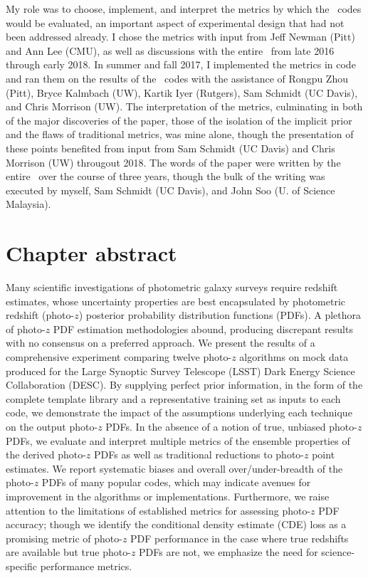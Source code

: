 My role was to choose, implement, and interpret the metrics by which the \pzpdf\ codes would be evaluated, an important aspect of experimental design that had not been addressed already.
I chose the metrics with input from Jeff Newman (Pitt) and Ann Lee (CMU), as well as discussions with the entire \pzwg\ from late 2016 through early 2018.
In summer and fall 2017, I implemented the metrics in code and ran them on the results of the \pzpdf\ codes with the assistance of Rongpu Zhou (Pitt), Bryce Kalmbach (UW), Kartik Iyer (Rutgers), Sam Schmidt (UC Davis), and Chris Morrison (UW).
The interpretation of the metrics, culminating in both of the major discoveries of the paper, those of the isolation of the implicit prior and the flaws of traditional metrics, was mine alone, though the presentation of these points benefited from input from Sam Schmidt (UC Davis) and Chris Morrison (UW) througout 2018.
The words of the paper were written by the entire \pzwg\ over the course of three years, though the bulk of the writing was executed by myself, Sam Schmidt (UC Davis), and John Soo (U. of Science Malaysia).

\section*{Chapter abstract}

Many scientific investigations of photometric galaxy surveys require redshift estimates, whose uncertainty properties are best encapsulated by photometric redshift (photo-$z$) posterior probability distribution functions (PDFs).
A plethora of photo-$z$ PDF estimation methodologies abound, producing discrepant results with no consensus on a preferred approach.
We present the results of a comprehensive experiment comparing twelve photo-$z$ algorithms on mock data produced for the Large Synoptic Survey Telescope (\textsc{LSST}) Dark Energy Science Collaboration (\textsc{DESC}).
By supplying perfect prior information, in the form of the complete template library and a representative training set as inputs to each code, we demonstrate the impact of the assumptions underlying each technique on the output photo-$z$ PDFs.
In the absence of a notion of true, unbiased photo-$z$ PDFs, we evaluate and interpret multiple metrics of the ensemble properties of the derived photo-$z$ PDFs as well as traditional reductions to photo-$z$ point estimates.
We report systematic biases and overall over/under-breadth of the photo-$z$ PDFs of many popular codes, which may indicate avenues for improvement in the algorithms or implementations.
Furthermore, we raise attention to the limitations of established metrics for assessing photo-$z$ PDF accuracy; though we identify the conditional density estimate (CDE) loss as a promising metric of photo-$z$ PDF performance in the case where true redshifts are available but true photo-$z$ PDFs are not, we emphasize the need for science-specific performance metrics.

